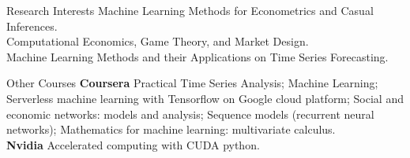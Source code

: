 \documentclass{resume} %
\begin{document}
\begin{rSection}{Research Interests}
Machine Learning Methods for Econometrics and Casual Inferences.
\\Computational Economics, Game Theory, and Market Design.
\\Machine Learning Methods and their Applications on Time Series Forecasting.
\end{rSection}

\begin{rSection}{Other Courses}
	\textbf{Coursera} Practical Time Series Analysis; Machine Learning; Serverless machine learning with Tensorflow on Google cloud platform; Social and economic networks: models and analysis; Sequence models (recurrent neural networks); Mathematics for machine learning: multivariate calculus.
	\\
	\textbf{Nvidia} Accelerated computing with CUDA python.
\end{rSection}


%
%
%



%
\end{document}
